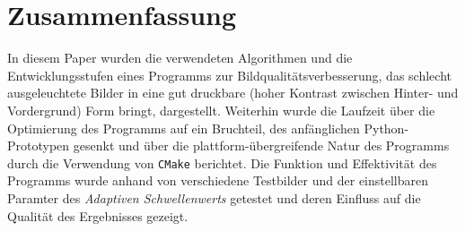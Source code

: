 \documentclass[sigconf]{acmart}
\begin{document}
\section{Zusammenfassung}
In diesem Paper wurden die verwendeten Algorithmen und die Entwicklungsstufen
eines Programms zur Bildqualitätsverbesserung, das schlecht ausgeleuchtete Bilder
in eine gut druckbare (hoher Kontrast zwischen Hinter- und Vordergrund) Form bringt,
dargestellt.
Weiterhin wurde die Laufzeit über die Optimierung des Programms auf ein Bruchteil,
des anfänglichen Python-Prototypen gesenkt und über die plattform-übergreifende
Natur des Programms durch die Verwendung von \texttt{CMake} berichtet. Die Funktion
und Effektivität des Programms wurde anhand von verschiedene Testbilder und der
einstellbaren Paramter des \emph{Adaptiven Schwellenwerts} 
getestet und deren Einfluss auf die Qualität des Ergebnisses gezeigt.



\end{document}
